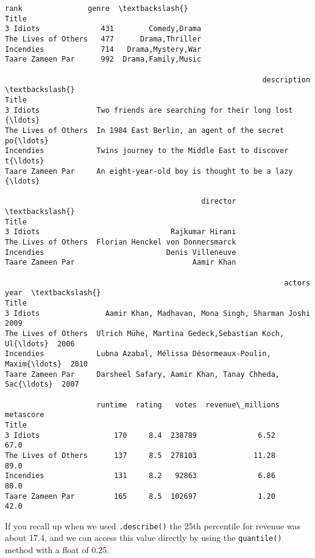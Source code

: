 \documentclass[11pt]{article}
\makeatletter
\newcommand{\boxspacing}{\kern\kvtcb@left@rule\kern\kvtcb@boxsep}
\newcommand{\prompt}[4]{
        {\ttfamily\llap{{\color{#2}[#3]:\hspace{3pt}#4}}\vspace{-\baselineskip}}
    }
\makeatother
\begin{document}
            \begin{tcolorbox}[breakable, size=fbox, boxrule=.5pt, pad at break*=1mm, opacityfill=0]
\prompt{Out}{outcolor}{49}{\boxspacing}
\begin{Verbatim}[commandchars=\\\{\}]
                     rank               genre  \textbackslash{}
Title
3 Idiots              431        Comedy,Drama
The Lives of Others   477      Drama,Thriller
Incendies             714   Drama,Mystery,War
Taare Zameen Par      992  Drama,Family,Music

                                                           description  \textbackslash{}
Title
3 Idiots             Two friends are searching for their long lost {\ldots}
The Lives of Others  In 1984 East Berlin, an agent of the secret po{\ldots}
Incendies            Twins journey to the Middle East to discover t{\ldots}
Taare Zameen Par     An eight-year-old boy is thought to be a lazy {\ldots}

                                             director  \textbackslash{}
Title
3 Idiots                              Rajkumar Hirani
The Lives of Others  Florian Henckel von Donnersmarck
Incendies                            Denis Villeneuve
Taare Zameen Par                           Aamir Khan

                                                                actors  year  \textbackslash{}
Title
3 Idiots               Aamir Khan, Madhavan, Mona Singh, Sharman Joshi  2009
The Lives of Others  Ulrich Mühe, Martina Gedeck,Sebastian Koch, Ul{\ldots}  2006
Incendies            Lubna Azabal, Mélissa Désormeaux-Poulin, Maxim{\ldots}  2010
Taare Zameen Par     Darsheel Safary, Aamir Khan, Tanay Chheda, Sac{\ldots}  2007

                     runtime  rating   votes  revenue\_millions  metascore
Title
3 Idiots                 170     8.4  238789              6.52       67.0
The Lives of Others      137     8.5  278103             11.28       89.0
Incendies                131     8.2   92863              6.86       80.0
Taare Zameen Par         165     8.5  102697              1.20       42.0
\end{Verbatim}
\end{tcolorbox}
        
    If you recall up when we used \texttt{.describe()} the 25th percentile
for revenue was about 17.4, and we can access this value directly by
using the \texttt{quantile()} method with a float of 0.25.
\end{document}
